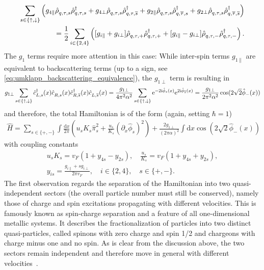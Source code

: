 \documentclass{svmono}
\def\ri{\mathrm i}
\def\re{\mathrm e}
\def\rd{\mathrm d}
\def\pdag{{\vphantom\dag}}
\newcommand{\brlr}[1]{\left( #1 \right)}
\begin{document}
\begin{align}
  \sum_{s\in\{\uparrow,\downarrow\}}
  \brlr{
  g_{4\parallel}\hat\rho^\pdag_{q,\tau,s}\hat\rho^\dag_{q,\tau,s}
  +
  g_{4\perp}\hat\rho^\pdag_{q,\tau,s}\hat\rho^\dag_{q,\tau,\overline s}
  +
  g_{2\parallel}\hat\rho^\pdag_{q,\tau,s}\hat\rho^\dag_{q,\overline\tau,s}
  +
  g_{2\perp}\hat\rho^\pdag_{q,\tau,s}\hat\rho^\dag_{q,\overline\tau,\overline s}
  }
  \\
  =
  \frac12
  \sum_{i\in\{2,4\}}
  \brlr{
  [g_{i\parallel}+g_{i\perp}]\hat\rho^\pdag_{q,\tau,+}\hat\rho^\dag_{q,\tau,+}
  +
  [g_{i\parallel}-g_{i\perp}]\hat\rho^\pdag_{q,\tau,-}\hat\rho^\dag_{q,\tau,-}
  }.
\end{align}
The $g_1$ terms require more attention in this case:
While inter-spin terms $g_{1\parallel}$ are equivalent to backscattering terms (up to a sign, see \cref{eq:umklapp_backscattering_equivalence}), the $g_{1\perp}$ term is resulting in
\begin{align}
    g_{1\perp}\sum_{s\in\{\uparrow,\downarrow\}}\hat c^\dag_{L,s}(x)\hat c^\pdag_{R,s}(x)\hat c^\dag_{R,\overline s}(x)\hat c^\pdag_{L,\overline s}(x)
    =
    \frac{g_{1\perp}}{4\pi^2\alpha^2 }\sum_{s\in\{\uparrow,\downarrow\}}\re^{-2\ri\hat \phi_s(x)}\re^{2\ri\hat \phi_{\overline s}(x)}
    =
    \frac{g_{1\perp}}{2\pi^2\alpha^2}\cos(2\sqrt2\hat \phi_-(x))
\end{align}
and therefore, the total Hamiltonian is of the form (again, setting $\hbar=1$)
\begin{align}
    \hat H = \sum_{s\in\{+,-\}}\int\frac{\rd x}{2\pi}\brlr{u_s K_s\hat\pi_s^2 + \frac{u_s}{K_s}(\partial_x\hat\phi_s)^2}
    +
    \frac{2g_{1\perp}}{(2\pi\alpha)^2}\int\rd x\cos(2\sqrt2\hat\phi_-(x))
    \label{eq:ll_hamiltonian_spin}
\end{align}
with coupling constants
\begin{align}
    u_sK_s = v_F(1+y_{4s}-y_{2s}),
    \quad
    \frac{u_s}{K_s} = v_F(1+y_{4s}+y_{2s}),
    \\
    y_{is} = \frac{g_{i\parallel}+sg_{i\perp}}{2\pi v_F},
    \quad
    i\in\{2,4\},
    \quad
    s\in\{+,-\}.
\end{align}
The first observation regards the separation of the Hamiltonian into two quasi-independent sectors (the overall particle number must still be conserved), namely those of charge and spin excitations propagating with different velocities.
This is famously known as spin-charge separation and a feature of all one-dimensional metallic systems.
It describes the fractionalization of particles into two distinct quasi-particles, called spinons with zero charge and spin 1/2 and chargeons with charge minus one and no spin.
As is clear from the discussion above, the two sectors remain independent and therefore move in general with different velocities~\cite{Tomonaga1950,Luttinger1963,Haldane1981,Kim2006}.
\end{document}
